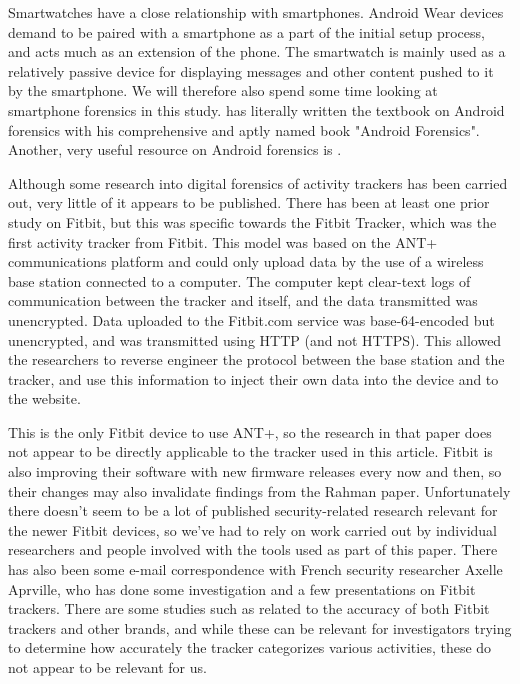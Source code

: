 \documentclass[a4paper,11pt,dvips]{article}
\begin{document}
Smartwatches have a close relationship with smartphones. Android Wear devices demand to be paired with a smartphone as a part of the initial setup process, and acts much as an extension of the phone. The smartwatch is mainly used as a relatively passive device for displaying messages and other content pushed to it by the smartphone. We will therefore also spend some time looking at smartphone forensics in this study. \cite{hoog2011android} has literally written the textbook on Android forensics with his comprehensive and aptly named book "Android Forensics". Another, very useful resource on Android forensics is \cite{vidas2011toward}.

Although some research into digital forensics of activity trackers has been carried out, very little of it appears to be published. There has been at least one prior study on Fitbit, but this was specific towards the Fitbit Tracker, which was the first activity tracker from Fitbit. This model was based on the ANT+ communications platform and could only upload data by the use of a wireless base station connected to a computer. The computer kept clear-text logs of communication between the tracker and itself, and the data transmitted was unencrypted. Data uploaded to the Fitbit.com service was base-64-encoded but unencrypted, and was transmitted using HTTP (and not HTTPS). This allowed the researchers to reverse engineer the protocol between the base station and the tracker, and use this information to inject their own data into the device and to the website. \citep{rahman2013fit}

This is the only Fitbit device to use ANT+, so the research in that paper does not appear to be directly applicable to the tracker used in this article. Fitbit is also improving their software with new firmware releases every now and then, so their changes may also invalidate findings from the Rahman paper. Unfortunately there doesn’t seem to be a lot of published security-related research relevant for the newer Fitbit devices, so we’ve had to rely on work carried out by individual researchers and people involved with the tools used as part of this paper. There has also been some e-mail correspondence with French security researcher Axelle Aprville, who has done some investigation and a few presentations on Fitbit trackers. There are some studies such as \cite{lee2014validity} related to the accuracy of both Fitbit trackers and other brands, and while these can be relevant for investigators trying to determine how accurately the tracker categorizes various activities, these do not appear to be relevant for us.
\end{document}
